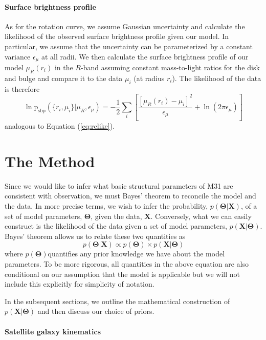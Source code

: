 \documentclass[preprint,12pt]{aastex}
\newcommand{\eqlabel}[1]{\label{eq:#1}}
\newcommand{\eq}[1]{Equation (\ref{eq:#1})}
\newcommand{\bvec}[1]{\ensuremath{\boldsymbol{#1}}}
\renewcommand{\vector}[1]{\ensuremath{\bvec{#1}}}
\newcommand{\model}{\vector{\Theta}}
\newcommand{\data}{\vector{X}}
\newcommand{\prob}{\ensuremath{p}}
\newcommand{\probability}[2]{\ensuremath{\prob ( #1 | #2 )}}
\newcommand{\likelihood}{\probability{\data}{\model}}
\newcommand{\posterior}{\probability{\model}{\data}}
\newcommand{\prior}{\ensuremath{\prob (\model)}}
\begin{document}
\paragraph{Surface brightness profile}

As for the rotation curve, we assume Gaussian uncertainty and calculate the
likelihood of the observed surface brightness profile given our model.  In
particular, we assume that the uncertainty can be parameterized by a constant
variance $\epsilon_\mu$ at all radii.  We then calculate the surface brightness
profile of our model $\mu_R (r_i)$ in the $R$-band assuming constant
mass-to-light ratios for the disk and bulge and compare it to the data
$\mu_i$ (at radius $r_i$).  The likelihood of the data is therefore
\begin{equation}
    \eqlabel{sbpprob}
    \ln \mathrm{p}_\mathrm{sbp} (\{ r_i, \mu_i \} | \mu_R,\epsilon_\mu )
    = - \frac{1}{2} \sum_i \left [ \frac{\left [ \mu_R (r_i) - \mu_i \right ]^2 }
        {\epsilon_\mu} + \ln (2 \pi \epsilon_\mu) \right ]
\end{equation}
analogous to \eq{rclike}.



\section{The Method}

Since we would like to infer what basic structural parameters of M31 are consistent
with observation, we must Bayes' theorem to reconcile the model and the data.
In more precise terms, we wish to infer the probability, \posterior, of a set
of model parameters, \model, given the data, \data.  Conversely, what we can
easily construct is the likelihood of the data given a set of model parameters,
\likelihood.  Bayes' theorem allows us to relate these two quantities as
\begin{equation}
    \posterior \propto \prior \times \likelihood
\end{equation}
where \prior quantifies any prior knowledge we have about the model parameters.
To be more rigorous, all quantities in the above equation are also conditional
on our assumption that the model is applicable but we will not include this
explicitly for simplicity of notation.

In the subsequent sections, we outline the mathematical construction of \likelihood
and then discuss our choice of priors.

\paragraph{Satellite galaxy kinematics}
\end{document}
